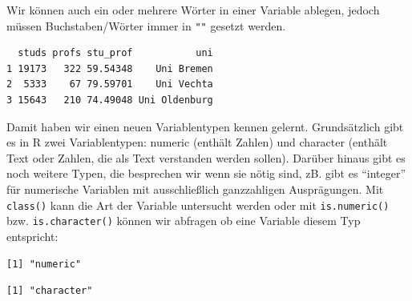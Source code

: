 \documentclass[
  letterpaper,
  DIV=11,
  numbers=noendperiod]{scrreprt}
\newenvironment{Shaded}{\begin{snugshade}}{\end{snugshade}}
\newcommand{\FunctionTok}[1]{\textcolor[rgb]{0.28,0.35,0.67}{#1}}
\newcommand{\NormalTok}[1]{\textcolor[rgb]{0.00,0.46,0.62}{#1}}
\newcommand{\OtherTok}[1]{\textcolor[rgb]{0.00,0.46,0.62}{#1}}
\newcommand{\SpecialCharTok}[1]{\textcolor[rgb]{0.37,0.37,0.37}{#1}}
\newcommand{\StringTok}[1]{\textcolor[rgb]{0.13,0.47,0.30}{#1}}
\begin{document}
Wir können auch ein oder mehrere Wörter in einer Variable ablegen,
jedoch müssen Buchstaben/Wörter immer in \texttt{""} gesetzt werden.

\begin{Shaded}
\end{Shaded}

\begin{verbatim}
  studs profs stu_prof           uni
1 19173   322 59.54348    Uni Bremen
2  5333    67 79.59701    Uni Vechta
3 15643   210 74.49048 Uni Oldenburg
\end{verbatim}

Damit haben wir einen neuen Variablentypen kennen gelernt. Grundsätzlich
gibt es in R zwei Variablentypen: numeric (enthält Zahlen) und character
(enthält Text oder Zahlen, die als Text verstanden werden sollen).
Darüber hinaus gibt es noch weitere Typen, die besprechen wir wenn sie
nötig sind, zB. gibt es ``integer'' für numerische Variablen mit
ausschließlich ganzzahligen Ausprägungen. Mit \texttt{class()} kann die
Art der Variable untersucht werden oder mit \texttt{is.numeric()} bzw.
\texttt{is.character()} können wir abfragen ob eine Variable diesem Typ
entspricht:

\begin{Shaded}
\end{Shaded}

\begin{verbatim}
[1] "numeric"
\end{verbatim}

\begin{Shaded}
\end{Shaded}

\begin{verbatim}
[1] "character"
\end{verbatim}
\end{document}
